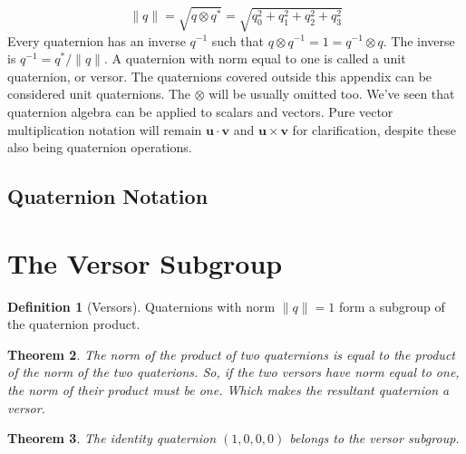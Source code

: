 \documentclass{amsart}
\newtheorem{theorem}{Theorem}[section]
\theoremstyle{definition}
\newtheorem{definition}[theorem]{Definition}
\theoremstyle{remark}
\numberwithin{equation}{section}
\begin{document}
\begin{equation}
  \|q\| = \sqrt{q\otimes q^*} = \sqrt{q_0^2+q_1^2+q_2^2+q_3^2}
\end{equation}
Every quaternion has an inverse $q^{-1}$ such that $q\otimes q^{-1}=1=q^{-1}\otimes q$. The inverse is $q^{-1}=q^*/\|q\|$. A quaternion with norm equal to one is called a unit quaternion, or versor. The quaternions covered outside this appendix can be considered unit quaternions. The $\otimes$ will be usually omitted too. We've seen that quaternion algebra can be applied to scalars and vectors. Pure vector multiplication notation will remain $\mathbf{u}\cdot\mathbf{v}$ and $\mathbf{u}\times\mathbf{v}$ for clarification, despite these also being quaternion operations.

\subsection{Quaternion Notation}




\section{The Versor Subgroup}
  
\begin{definition}[Versors]
  Quaternions with norm $\|q\|=1$ form a subgroup of the quaternion product.
\end{definition}

\begin{theorem}
  The norm of the product of two quaternions is equal to the product of the norm of the two quaterions. So, if the two versors have norm equal to one, the norm of their product must be one. Which makes the resultant quaternion a versor.
\end{theorem}

\begin{theorem}
  The identity quaternion $(1, 0, 0, 0)$ belongs to the versor subgroup.
\end{theorem}
\end{document}
